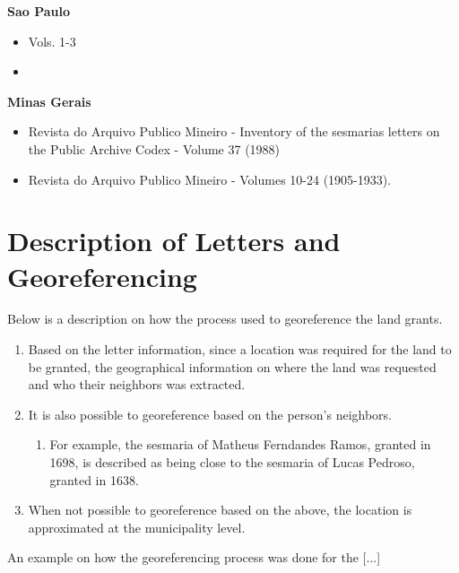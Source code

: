 \documentclass[11pt]{article}
\begin{document}
\textbf{Sao Paulo}
\begin{itemize}
\item \textcite{noauthor_1921-qd} Vols. 1-3 
\item \textcite{Instituto-Historico-e-Geografico-de-Sao-Paulo1928-ej}
\end{itemize}

\textbf{Minas Gerais}
\begin{itemize}
  \item Revista do Arquivo Publico Mineiro - Inventory of the sesmarias letters on the Public Archive Codex - Volume 37 (1988)
  \item Revista do Arquivo Publico Mineiro - Volumes 10-24 (1905-1933). 
\end{itemize}

\clearpage

\section{Description of Letters and Georeferencing}
\label{app:appendix_data}

Below is a description on how the process used to georeference the land grants.

\begin{enumerate}
  \item Based on the letter information, since a location was required for the land to be granted, the geographical information on where the land was requested and who their neighbors was extracted.
  \item It is also possible to georeference based on the person's neighbors. 
  \begin{enumerate}
    \item For example, the sesmaria of Matheus Ferndandes Ramos, granted in 1698, is described as being close to the sesmaria of Lucas Pedroso, granted in 1638. 
  \end{enumerate}
  \item When not possible to georeference based on the above, the location is approximated at the municipality level. 
\end{enumerate}

An example on how the georeferencing process was done for the [...]
\end{document}

